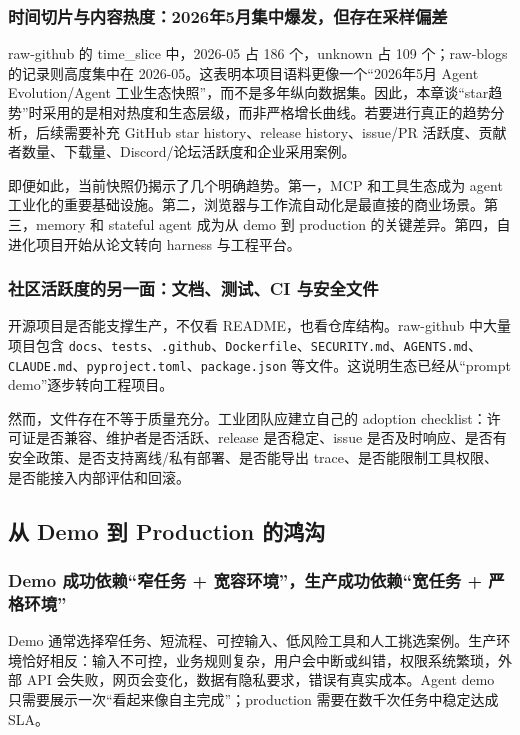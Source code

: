 \subsubsection{时间切片与内容热度：2026年5月集中爆发，但存在采样偏差}

raw-github 的 time\_slice 中，2026-05 占 186 个，unknown 占 109 个；raw-blogs 的记录则高度集中在 2026-05。这表明本项目语料更像一个``2026年5月 Agent Evolution/Agent 工业生态快照''，而不是多年纵向数据集。因此，本章谈``star趋势''时采用的是相对热度和生态层级，而非严格增长曲线。若要进行真正的趋势分析，后续需要补充 GitHub star history、release history、issue/PR 活跃度、贡献者数量、下载量、Discord/论坛活跃度和企业采用案例。

即便如此，当前快照仍揭示了几个明确趋势。第一，MCP 和工具生态成为 agent 工业化的重要基础设施。第二，浏览器与工作流自动化是最直接的商业场景。第三，memory 和 stateful agent 成为从 demo 到 production 的关键差异。第四，自进化项目开始从论文转向 harness 与工程平台。

\subsubsection{社区活跃度的另一面：文档、测试、CI 与安全文件}

开源项目是否能支撑生产，不仅看 README，也看仓库结构。raw-github 中大量项目包含 \texttt{docs}、\texttt{tests}、\texttt{.github}、\texttt{Dockerfile}、\texttt{SECURITY.md}、\texttt{AGENTS.md}、\texttt{CLAUDE.md}、\texttt{pyproject.toml}、\texttt{package.json} 等文件。这说明生态已经从``prompt demo''逐步转向工程项目。

然而，文件存在不等于质量充分。工业团队应建立自己的 adoption checklist：许可证是否兼容、维护者是否活跃、release 是否稳定、issue 是否及时响应、是否有安全政策、是否支持离线/私有部署、是否能导出 trace、是否能限制工具权限、是否能接入内部评估和回滚。

\subsection{从 Demo 到 Production 的鸿沟}\label{sec:ch6-gap}

\subsubsection{Demo 成功依赖``窄任务 + 宽容环境''，生产成功依赖``宽任务 + 严格环境''}

Demo 通常选择窄任务、短流程、可控输入、低风险工具和人工挑选案例。生产环境恰好相反：输入不可控，业务规则复杂，用户会中断或纠错，权限系统繁琐，外部 API 会失败，网页会变化，数据有隐私要求，错误有真实成本。Agent demo 只需要展示一次``看起来像自主完成''；production 需要在数千次任务中稳定达成 SLA。

